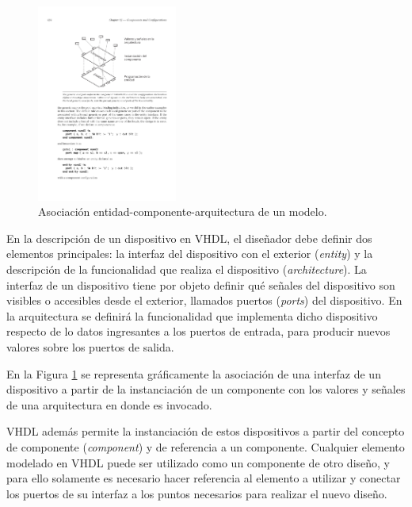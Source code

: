 \begin{figure}
  \vspace{-20pt}
  \begin{center}
    \includegraphics[width=0.41\textwidth]{Imágenes/Asociación entidad-componente.pdf}
  \end{center}
  \caption{Asociación entidad-componente-arquitectura de un modelo.}
  \label{entidad-componente}
\end{figure}

En la descripción de un dispositivo en VHDL, el diseñador debe definir dos elementos principales: la interfaz del dispositivo con el exterior (\emph{entity}) y la descripción de la funcionalidad que realiza el dispositivo \mbox{(\emph{architecture}}). La interfaz de un dispositivo tiene por objeto definir qué señales del dispositivo son visibles o accesibles desde el exterior, llamados puertos (\emph{ports}) del dispositivo. En la arquitectura se definirá la funcionalidad que implementa dicho dispositivo respecto de lo datos ingresantes a los puertos de entrada, para producir nuevos valores sobre los puertos de salida.

En la Figura \ref{entidad-componente} se representa gráficamente la asociación de una interfaz de un dispositivo a partir de la instanciación de un componente con los valores y señales de una arquitectura en donde es invocado.

VHDL además permite la instanciación de estos dispositivos a partir del concepto de componente (\emph{component}) y de referencia a un componente. Cualquier elemento modelado en VHDL puede ser utilizado como un componente de otro diseño, y para ello solamente es necesario hacer referencia al elemento a utilizar y conectar los puertos de su interfaz a los puntos necesarios para realizar el nuevo diseño.


